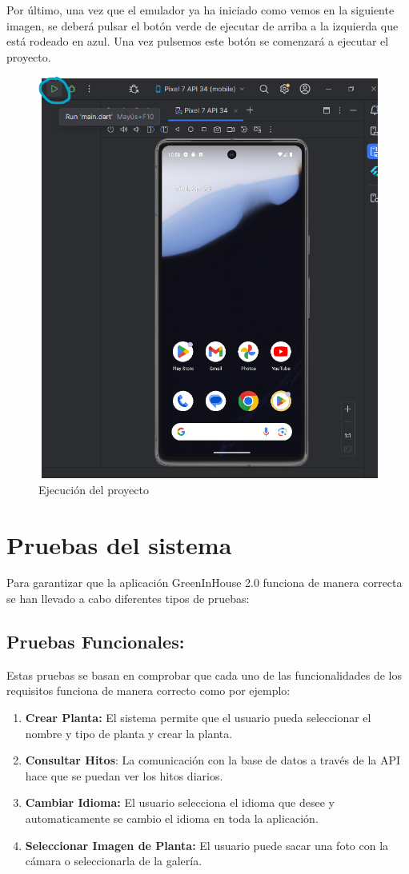 Por último, una vez que el emulador ya ha iniciado como vemos en la siguiente imagen, se deberá pulsar el botón verde de ejecutar de arriba a la izquierda que está rodeado en azul. Una vez pulsemos este botón se comenzará a ejecutar el proyecto.

\begin{figure}[H]
    \centering
    \includegraphics[width=0.8\linewidth]{InstalacionyEjecucion6.png}
    \caption{Ejecución del proyecto}
    \label{C17}
\end{figure}


\section{Pruebas del sistema}
Para garantizar que la aplicación GreenInHouse 2.0 funciona de manera correcta se han llevado a cabo diferentes tipos de pruebas: 

\subsection{Pruebas Funcionales:} Estas pruebas se basan en comprobar que cada uno de las funcionalidades de los requisitos funciona de manera correcto como por ejemplo:
    \begin{enumerate}
        \item \textbf{Crear Planta:} El sistema permite que el usuario pueda seleccionar el nombre y tipo de planta y crear la planta.
        \item \textbf{Consultar Hitos}: La comunicación con la base de datos a través de la API hace que se puedan ver los hitos diarios.
        \item \textbf{Cambiar Idioma:} El usuario selecciona el idioma que desee y automaticamente se cambio el idioma en toda la aplicación.
        \item \textbf{Seleccionar Imagen de Planta:} El usuario puede sacar una foto con la cámara o seleccionarla de la galería.
    \end{enumerate}
